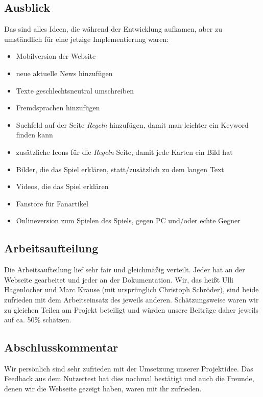 \documentclass{scrartcl}
\begin{document}
 \subsection*{Ausblick} 
 Das sind alles Ideen, die während der Entwicklung aufkamen, aber zu umständlich für eine jetzige Implementierung waren:
 \begin{itemize}
 \item Mobilversion der Website
\item neue aktuelle News hinzufügen
\item Texte geschlechtsneutral umschreiben
\item Fremdsprachen hinzufügen
\item Suchfeld auf der Seite \textit{Regeln} hinzufügen, damit man leichter ein Keyword finden kann
\item zusätzliche Icons für die \textit{Regeln}-Seite, damit jede Karten ein Bild hat
\item Bilder, die das Spiel erklären, statt/zusätzlich zu dem langen Text
\item Videos, die das Spiel erklären
\item Fanstore für Fanartikel
\item Onlineversion zum Spielen des Spiels, gegen PC und/oder echte Gegner
 \end{itemize}

\subsection*{Arbeitsaufteilung}

Die Arbeitsaufteilung lief sehr fair und gleichmäßig verteilt. Jeder hat an der Webseite gearbeitet und jeder an der Dokumentation. Wir, das heißt Ulli Hagenlocher und Marc Krause (mit ursprünglich Christoph Schröder), sind beide zufrieden mit dem Arbeitseinsatz des jeweils anderen. Schätzungsweise waren wir zu gleichen Teilen am Projekt beteiligt und würden unsere Beiträge daher jeweils auf ca. 50\% schätzen.

\subsection*{Abschlusskommentar}
Wir persönlich sind sehr zufrieden mit der Umsetzung unserer Projektidee. Das Feedback aus dem Nutzertest hat dies nochmal bestätigt und auch die Freunde, denen wir die Webseite gezeigt haben, waren mit ihr zufrieden.
\end{document}
